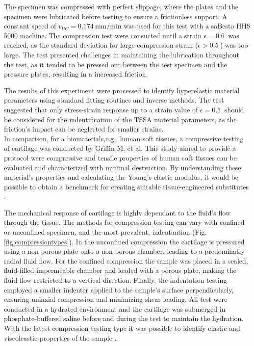 The specimen was compressed with perfect slippage, where the plates and the specimen were lubricated 
before testing to ensure a frictionless support. A constant speed of $v_{UC}=\SI[per-mode = symbol]{0.174}{\milli \m\per \minute}$
was used for this test with a saBesto HHS 5000 machine. The compression test were consucted until a strain $\epsilon=\SI{0.6}{}$ 
was reached, as the standard deviation for large compression strain ($\epsilon>\SI{0.5}{}$) was too large.
The test presented challenges in maintaining the lubrication throughout the test, as it tended to be 
pressed out between the test specimen and the pressure plates, resulting in a increased friction. 

The results of this experiment were processed to identify hyperelastic material parameters using standard 
fitting routines and inverse methods. The test suggested that only stress-strain response up to a strain value of 
$\epsilon=\SI{0.5}{}$ should be considered for the indentification of the TSSA material parameters, as 
the friction's impact can be neglected for smaller strains.\\

In comparison, for a biomaterials,e.g., human soft tissues, a compressive testing of cartilage was conducted by Griffin M. et al. 
This study aimed to provide a protocol were compressive and tensile properties of human soft tissues can be evaluated 
and characterized with minimal destruction. By understanding these material's properties and calculating the Young's 
elastic modulus, it would be possible to obtain a benchmark for creating suitable tissue-engineered substitutes \cite{Griffin2016}. 

The mechanical response of cartilage is highly dependant to the fluid's flow through the tissue. The methods for compression 
testing can vary with confined or unconfined specimen, and the most prevalent, indentantion (Fig. \ref{fig:compressiontypes}).
In the unconfined compression the cartilage is pressured using a non-porous plate onto a non-porous chamber, 
leading to a predominatly radial fluid flow. For the confined compression the sample was placed in a sealed, 
fluid-filled impermeable chamber and loaded with a porous plate, making the fluid flow restricted to a vertical direction.
Finally, the indentation testing employed a smaller indenter applied to the sample's surface perpendicularly, ensuring 
uniaxial compression and minimizing shear loading. All test were conducted in a 
hydrated environment and the cartilage was submerged in phosphate-buffered saline before and during the test to maintain 
the hydration. With the latest compression testing type it was possible to identify elastic and viscoleastic properties 
of the sample \cite{Griffin2016}.

